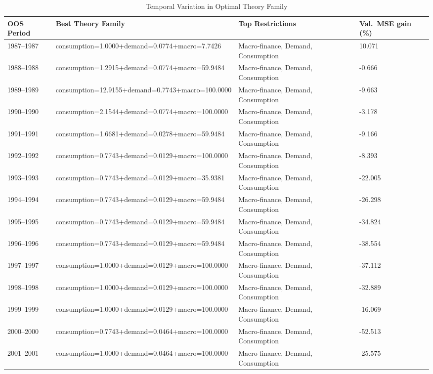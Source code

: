 \begin{table}[H]
\centering
\caption{Temporal Variation in Optimal Theory Family}
\label{tab:theory_ranking}
\small
\begin{tabular}{llll}
\toprule
OOS Period & Best Theory Family & Top Restrictions & Val.\ MSE gain (\%) \\
\midrule
1987--1987  & consumption=1.0000+demand=0.0774+macro=7.7426 & Macro-finance, Demand, Consumption & 10.071 \\
1988--1988  & consumption=1.2915+demand=0.0774+macro=59.9484 & Macro-finance, Demand, Consumption & -0.666 \\
1989--1989  & consumption=12.9155+demand=0.7743+macro=100.0000 & Macro-finance, Demand, Consumption & -9.663 \\
1990--1990  & consumption=2.1544+demand=0.0774+macro=100.0000 & Macro-finance, Demand, Consumption & -3.178 \\
1991--1991  & consumption=1.6681+demand=0.0278+macro=59.9484 & Macro-finance, Demand, Consumption & -9.166 \\
1992--1992  & consumption=0.7743+demand=0.0129+macro=100.0000 & Macro-finance, Demand, Consumption & -8.393 \\
1993--1993  & consumption=0.7743+demand=0.0129+macro=35.9381 & Macro-finance, Demand, Consumption & -22.005 \\
1994--1994  & consumption=0.7743+demand=0.0129+macro=59.9484 & Macro-finance, Demand, Consumption & -26.298 \\
1995--1995  & consumption=0.7743+demand=0.0129+macro=59.9484 & Macro-finance, Demand, Consumption & -34.824 \\
1996--1996  & consumption=0.7743+demand=0.0129+macro=59.9484 & Macro-finance, Demand, Consumption & -38.554 \\
1997--1997  & consumption=1.0000+demand=0.0129+macro=100.0000 & Macro-finance, Demand, Consumption & -37.112 \\
1998--1998  & consumption=1.0000+demand=0.0129+macro=100.0000 & Macro-finance, Demand, Consumption & -32.889 \\
1999--1999  & consumption=1.0000+demand=0.0129+macro=100.0000 & Macro-finance, Demand, Consumption & -16.069 \\
2000--2000  & consumption=0.7743+demand=0.0464+macro=100.0000 & Macro-finance, Demand, Consumption & -52.513 \\
2001--2001  & consumption=1.0000+demand=0.0464+macro=100.0000 & Macro-finance, Demand, Consumption & -25.575 \\

\end{tabular}
\end{table}
